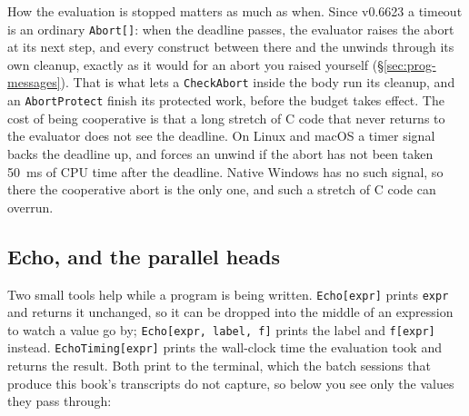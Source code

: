 How the evaluation is stopped matters as much as when. Since v0.6623 a timeout is
an ordinary \texttt{Abort[]}: when the deadline passes, the evaluator raises the
abort at its next step, and every construct between there and the
 unwinds through its own cleanup, exactly as it would for an
abort you raised yourself (\S\ref{sec:prog-messages}). That is what lets a
\texttt{CheckAbort} inside the body run its cleanup, and an \texttt{AbortProtect}
finish its protected work, before the budget takes effect.
The cost of being cooperative is that a long stretch of C code that never returns
to the evaluator does not see the deadline. On Linux and macOS a timer signal backs
the deadline up, and forces an unwind if the abort has not been taken 50~ms of CPU
time after the deadline. Native Windows has no such signal, so there the cooperative
abort is the only one, and such a stretch of C code can
overrun.


\subsection{Echo, and the parallel heads}
\label{ssec:prog-echo}

Two small tools help while a program is being written. \texttt{Echo[expr]} prints
\texttt{expr} and returns it unchanged, so it can be dropped into the middle of an
expression to watch a value go by; \texttt{Echo[expr, label, f]} prints the label and
\texttt{f[expr]} instead. \texttt{EchoTiming[expr]} prints the wall-clock time the
evaluation took and returns the result. Both print to the terminal, which the batch
sessions that produce this book's transcripts do not capture, so below you see only
the values they pass through:

